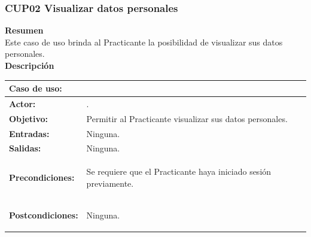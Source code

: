 \subsubsection{CUP02 Visualizar datos personales}
\label{cu:CUP02}

\textbf{\textcolor[rgb]{0, 0, 0.545098}{Resumen}} \\

Este caso de uso brinda al Practicante la posibilidad de visualizar sus datos personales.\\

\textbf{\textcolor[rgb]{0, 0, 0.545098}{Descripción}}

\begin{table}[H]
\centering
\begin{tabular}{| l | p{12 cm} |}
\hline
\rowcolor[rgb]{0.529412, 0.807843, 0.980392} {\textbf{Caso de uso:}} & \hspace{7em}{\textbf{CUP02 Visualizar datos personales}}\\
\hline
\textbf{Actor:} &  \nameref{act:Practicante}. \\
\hline
\textbf{Objetivo:} & Permitir al Practicante visualizar sus datos personales. \\
\hline
\textbf{Entradas:} & Ninguna. \\
\hline
\textbf{Salidas:} &	Ninguna. \\
\hline
\textbf{Precondiciones:} & 	\vspace{-2mm}	%
							\begin{compactitem}
							\setlength\itemsep{-0.25em}
								\item Se requiere que el Practicante haya iniciado sesión previamente.
							\end{compactitem} \\
\hline
\textbf{Postcondiciones:} & \vspace{-2mm}	%
							\begin{compactitem}
								\item Ninguna.
							\end{compactitem}\\
							

\end{tabular}
\end{table}
